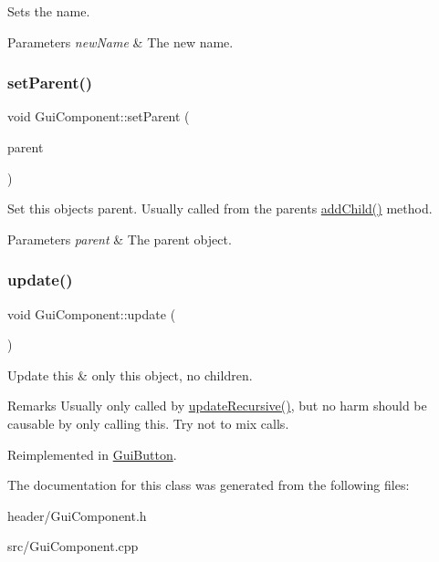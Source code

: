 Sets the name. 


\begin{DoxyParams}{Parameters}
{\em new\+Name} & The new name. \\
\hline
\end{DoxyParams}
\mbox{\label{class_gui_component_a526481fb2424c1ea771e78be27a091f9}} 
\subsubsection{\texorpdfstring{set\+Parent()}{setParent()}}
{\footnotesize\ttfamily void Gui\+Component\+::set\+Parent (\begin{DoxyParamCaption}\item[{\mbox{\hyperlink{class_gui_component}{Gui\+Component}} $\ast$}]{parent }\end{DoxyParamCaption})}



Set this object\textquotesingle{}s parent. Usually called from the parent\textquotesingle{}s \mbox{\hyperlink{class_gui_component_a5bccaccef3d0eab8af3be84cab1300de}{add\+Child()}} method. 


\begin{DoxyParams}{Parameters}
{\em parent} & The parent object. \\
\hline
\end{DoxyParams}
\mbox{\label{class_gui_component_adacaca1d0604e6b93cb22962e60cc285}} 
\subsubsection{\texorpdfstring{update()}{update()}}
{\footnotesize\ttfamily void Gui\+Component\+::update (\begin{DoxyParamCaption}{ }\end{DoxyParamCaption})\hspace{0.3cm}{\ttfamily [virtual]}}



Update this \& only this object, no children. 

\begin{DoxyRemark}{Remarks}
Usually only called by \mbox{\hyperlink{class_gui_component_ac58e20a01f67cf605b069ef853dfab66}{update\+Recursive()}}, but no harm should be causable by only calling this. Try not to mix calls. 
\end{DoxyRemark}


Reimplemented in \mbox{\hyperlink{class_gui_button_afd7f69faf6201309727bce6ff9d04f56}{Gui\+Button}}.



The documentation for this class was generated from the following files\+:\begin{DoxyCompactItemize}
\item 
header/Gui\+Component.\+h\item 
src/Gui\+Component.\+cpp\end{DoxyCompactItemize}
